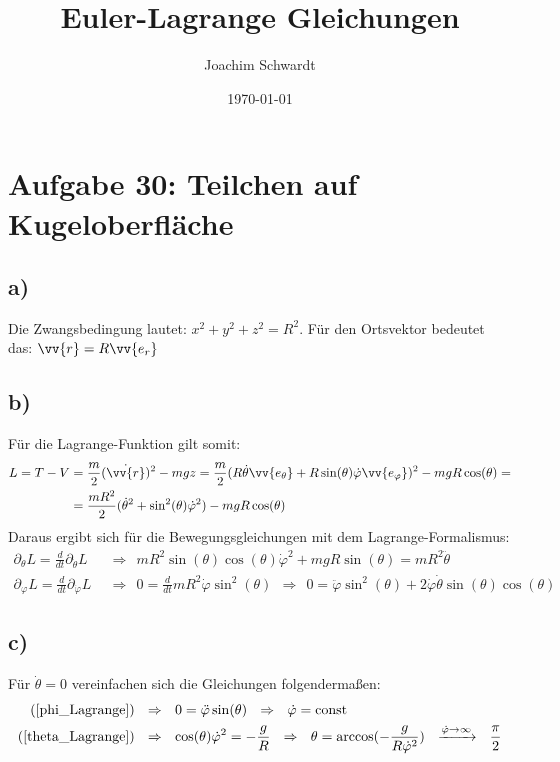 \documentclass[a4paper,12pt]{article}
\begin{document}
\title{Euler-Lagrange Gleichungen}
\author{Joachim Schwardt}
\date{\today}
\maketitle

\section*{Aufgabe 30: Teilchen auf Kugeloberfläche}
\subsection*{a)} Die Zwangsbedingung lautet: $x^2+y^2+z^2 = R^2$. Für den Ortsvektor bedeutet das: $\vv{r}=R\vv{e_r}$
\subsection*{b)} Für die Lagrange-Funktion gilt somit:
\begin{align*}
L=T-V&=\frac{m}{2}(\dot{\vv{r}})^2-mgz=\frac{m}{2}(R\dot{\theta}\vv{e_{\theta}}+R\sin(\theta)\dot{\varphi}\vv{e_{\varphi}})^2-mgR\cos(\theta) = \\
&=\frac{mR^2}{2}(\dot{\theta}^2+\sin^2(\theta)\dot{\varphi}^2)-mgR\cos(\theta)
\end{align*}
Daraus ergibt sich für die Bewegungsgleichungen mit dem Lagrange-Formalismus:
\begin{align}
\partial_{\theta}L=\frac{d}{dt}\partial_{\dot{\theta}}L\ \ &\Rightarrow\ \ mR^2\sin(\theta)\cos(\theta)\dot{\varphi}^2+mgR\sin(\theta)=mR^2\ddot{\theta} \label{theta_Lagrange}\\
\partial_{\varphi}L=\frac{d}{dt}\partial_{\dot{\varphi}}L\ \ &\Rightarrow\ \ 0 = \frac{d}{dt}mR^2\dot{\varphi}\sin^2(\theta)\ \ \Rightarrow\ \ 0=\ddot{\varphi}\sin^2(\theta)+2\dot{\varphi}\dot{\theta}\sin(\theta)\cos(\theta) \label{phi_Lagrange}
\end{align}
\subsection*{c)} Für $\dot{\theta}=0$ vereinfachen sich die Gleichungen folgendermaßen:
\begin{align*}
(\ref{phi_Lagrange})\ \ &\Rightarrow\ \ 0=\ddot{\varphi}\sin(\theta)\ \ \Rightarrow\ \ \dot{\varphi}=\textrm{const}\\  
(\ref{theta_Lagrange})\ \ &\Rightarrow\ \ \cos(\theta)\dot{\varphi}^2=-\frac{g}{R}\ \ \Rightarrow\ \ \theta = \arccos(-\frac{g}{R\dot{\varphi}^2})\ \ \xrightarrow{\dot{\varphi}\to\infty}\ \ \frac{\pi}{2}
\end{align*}
\end{document}
